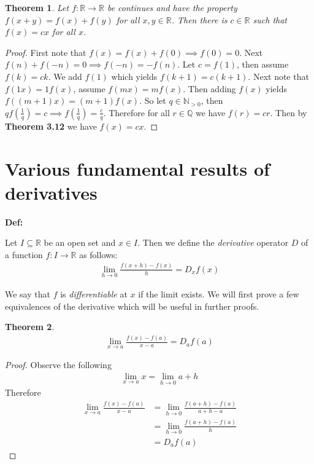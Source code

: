 \documentclass{article}
\newtheorem{theorem}{Theorem}[section]
\begin{document}
\begin{theorem}
	Let $f: \mathbb{R} \rightarrow \mathbb{R}$ be continues and have the
	property $f(x+y) = f(x) + f(y)$ for all $x,y \in \mathbb{R}$. Then there is
	$c \in \mathbb{R}$ such that $f(x)=cx$ for all $x$.
\end{theorem}
\begin{proof}
	First note that $f(x)=f(x)+f(0)\implies f(0)=0$. Next $f(n)+f(-n) = 0
	\implies f(-n) = - f(n)$. Let $c = f(1)$, then assume $f(k) = ck$. We add
	$f(1)$ which yields $f(k+1) = c(k+1)$. Next note that $f(1x) = 1 f(x)$,
	assume $f(mx) = m f(x)$. Then adding $f(x)$ yields $f((m+1)x) = (m+1)f(x)$.
	So let $q \in \mathbb{N}_{>0}$, then $qf(\frac{1}{q}) = c \implies
	f(\frac{1}{q}) = \frac{c}{q}$. Therefore for all $r \in \mathbb{Q}$ we have
	$f(r)=cr$. Then by \textbf{Theorem 3.12} we have $f(x)=cx$.
\end{proof}

\section{Various fundamental results of derivatives}

\textbf{Def:} 

Let $I \subseteq \mathbb{R}$ be an open set and $x \in I$. Then we define the 
\textit{derivative} operator $D$ of a function $f: I \rightarrow \mathbb{R}$ as 
follows:
\begin{align}
    \lim_{h \rightarrow 0} \frac{f(x+h)-f(x)}{h} = D_x f(x)
\end{align}

We say that $f$ is \textit{differentiable} at $x$ if the limit exists. We
will first prove a few equivalences of the derivative which will be useful
in further proofs.

\begin{theorem}
\begin{align}
    \lim_{x \rightarrow a} \frac{f(x)-f(a)}{x-a} = D_a f(a)
\end{align}
\end{theorem}
\begin{proof}
Observe the following
\begin{align}
    \lim_{x \rightarrow a} x = \lim_{h \rightarrow 0} a+h
\end{align}
Therefore
\begin{align}
    \lim_{x \rightarrow a} \frac{f(x)-f(a)}{x-a} &= 
    \lim_{h \rightarrow 0} \frac{f(a+h)-f(a)}{a+h-a} \\ \nonumber
    &= \lim_{h \rightarrow 0} \frac{f(a+h)-f(a)}{h} \\ \nonumber
    &= D_a f(a)
\end{align}
\end{proof}
\end{document}
